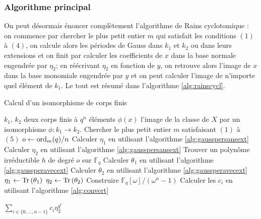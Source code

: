 \documentclass[a4paper]{article} %
\numberwithin{section}{part}
\numberwithin{equation}{section}
\newcommand\GF[1]{\mathbb{F}_{#1}}
\newcommand\Tr[1]{\textup{Tr}\left(#1\right)}
\newcommand\ord[2]{\textup{ord}_{#1}(#2)}
\begin{document}
\subsubsection*{Algorithme principal}

On peut désormais énoncer complètement l'algorithme de Rains cyclotomique : on
commence par chercher le plus petit entier $m$ qui satisfait les conditions
$(1)$ à $(4)$, on calcule alors les périodes de Gauss dans $k_1$ et $k_2$ ou
dans leurs extensions et on finit par calculer les coefficients de $x$ dans la
base normale engendrée par $\eta_2$; en réécrivant $\eta_2$ en fonction de $y$,
on retrouve alors l'image de $x$ dans la base monomiale engendrée par $y$ et on
peut calculer l'image de n'importe quel élément de $k_1$. Le tout est résumé
dans l'algorithme \ref{alg:rainscycl}.
\begin{algorithm}
\caption{Calcul d'un isomorphisme de corps finis}
\label{alg:rainscycl}
\begin{algorithmic}[1]
\REQUIRE $k_1$, $k_2$ deux corps finis à $q^n$ éléments
\ENSURE $\phi(x)$ l'image de la classe de $X$ par un isomorphisme $\phi : k_1
\to k_2$. 
\bigskip
\STATE Chercher le plus petit entier $m$ satisfaisant $(1)$ à $(5)$
\STATE $o \leftarrow \ord{m}{q}/n$
    \STATE Calculer $\eta_1$ en utilisant l'algorithme \ref{alg:gausspersansext}
    \STATE Calculer $\eta_2$ en utilisant l'algorithme \ref{alg:gausspersansext}
\ELSE
    \STATE Trouver un polynôme irréductible $h$ de degré $o$ sur $\GF{q}$
    \STATE Calculer $\theta_1$ en utilisant l'algorithme 
    \ref{alg:gaussperavecext}
    \STATE Calculer $\theta_2$ en utilisant l'algorithme 
    \ref{alg:gaussperavecext}
    \STATE $\eta_1 \leftarrow \Tr{\theta_1}$
    \STATE $\eta_2 \leftarrow \Tr{\theta_2}$
\ENDIF
\STATE Construire $\GF{q}[\omega]/(\omega^n - 1)$
\STATE Calculer les $c_i$ en utilisant l'algorithme \ref{alg:convert}

\RETURN $\sum_{i\in\lbrace{0,\dots,n-1}\rbrace}{c_i\eta_2^{q^i}}$

\end{algorithmic}
\end{algorithm}
\end{document}
